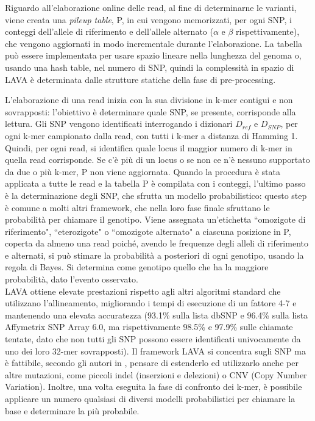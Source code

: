 \documentclass[../main.tex]{subfiles}
\begin{document}
\noindent
Riguardo all'elaborazione online delle read, al fine di determinarne le varianti, viene creata una \textit{pileup table}, P, in cui vengono memorizzati, per ogni SNP, i conteggi dell'allele di riferimento e dell'allele alternato ($\alpha$ e $\beta$ rispettivamente), che vengono aggiornati in modo incrementale durante l'elaborazione. La tabella può essere implementata per usare spazio lineare nella lunghezza del genoma o, usando una hash table, nel numero di SNP, quindi la complessità in spazio di LAVA è determinata dalle strutture statiche della fase di pre-processing.

L'elaborazione di una read inizia con la sua divisione in k-mer contigui e non sovrapposti: l'obiettivo è determinare quale SNP, se presente, corrisponde alla lettura. Gli SNP vengono identificati interrogando i dizionari $D_{ref}$ e $D_{SNP}$, per ogni k-mer campionato dalla read, con tutti i k-mer a distanza di Hamming 1. Quindi, per ogni read, si identifica quale locus il maggior numero di k-mer in quella read corrisponde. Se c'è più di un locus o se non ce n'è nessuno supportato da due o più k-mer, P non viene aggiornata. Quando la procedura è stata applicata a tutte le read e la tabella P è compilata con i conteggi, l'ultimo passo è la determinazione degli SNP, che sfrutta un modello probabilistico: questo step è comune a molti altri framework, che nella loro fase finale sfruttano le probabilità per chiamare il genotipo. Viene assegnata un'etichetta ``omozigote di riferimento", ``eterozigote" o ``omozigote alternato" a ciascuna posizione in P, coperta da almeno una read poiché, avendo le frequenze degli alleli di riferimento e alternati, si può stimare la probabilità a posteriori di ogni genotipo, usando la regola di Bayes. Si determina come genotipo quello che ha la maggiore probabilità, dato l'evento osservato. \\

\noindent
LAVA ottiene elevate prestazioni rispetto agli altri algoritmi standard che utilizzano l'allineamento, migliorando i tempi di esecuzione di un fattore 4-7 e mantenendo una elevata accuratezza (93.1\% sulla lista dbSNP e 96.4\% sulla lista Affymetrix SNP Array 6.0, ma rispettivamente 98.5\% e 97.9\% sulle chiamate tentate, dato che non tutti gli SNP possono essere identificati univocamente da uno dei loro 32-mer sovrapposti).
Il framework LAVA si concentra sugli SNP ma è fattibile, secondo gli autori in  \cite{shajii2016lava}, pensare di estenderlo ed utilizzarlo anche per altre mutazioni, come piccoli indel (inserzioni e delezioni) o CNV (Copy Number Variation). Inoltre, una volta eseguita la fase di confronto dei k-mer, è possibile applicare un numero qualsiasi di diversi modelli probabilistici per chiamare la base e determinare la più probabile. 
\end{document}

